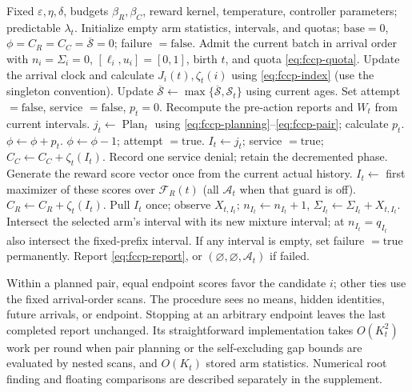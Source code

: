 \documentclass[11pt]{article}
\theoremstyle{remark}
\begin{document}
\begin{algorithm}[tbp]
\caption{Flexible certificate-cost planning (F-CCP)}\label{alg:flexible-ccp}
\footnotesize
\begin{algorithmic}[1]
\Require Fixed $\varepsilon,\eta,\delta$, budgets $\beta_R,\beta_C$,
reward kernel, temperature, controller parameters; predictable $\lambda_t$.
\State Initialize empty arm statistics, intervals, and quotas;
$\mathrm{base}=0$, $\phi=C_R=C_C=\overline{\mathcal S}=0$; failure $=\mathrm{false}$.
 \State Admit the current batch in arrival order with $n_i=\Sigma_i=0$,
 $[\ell_i,u_i]=[0,1]$, birth $t$, and quota \eqref{eq:fccp-quota}.
 \State Update the arrival clock and calculate $J_i(t),\zeta_t(i)$
 using \eqref{eq:fccp-index} (use the singleton convention).
 \State Update $\overline{\mathcal S}\gets
 \max\{\overline{\mathcal S},\mathcal S_t\}$ using current ages.
 \State Set attempt $=\mathrm{false}$, service $=\mathrm{false}$, $p_t=0$.
  \State Recompute the pre-action reports and $W_t$ from current intervals.
   \State $j_t\gets\operatorname{Plan}_t$ using
   \eqref{eq:fccp-planning}--\eqref{eq:fccp-pair}; calculate $p_t$.
   \State $\phi\gets\phi+p_t$.
    \State $\phi\gets\phi-1$; attempt $=\mathrm{true}$.
   \EndIf
  \EndIf
 \EndIf
   \State $I_t\gets j_t$; service $=\mathrm{true}$;
   $C_C\gets C_C+\zeta_t(I_t)$.
  \Else
   \State Record one service denial; retain the decremented phase.
  \EndIf
 \EndIf
  \State Generate the reward score vector once from the current actual history.
  \State $I_t\gets$ first maximizer of these scores over $\mathcal F_R(t)$
  (all $\mathcal A_t$ when that guard is off).
  \State $C_R\gets C_R+\zeta_t(I_t)$.
 \EndIf
 \State Pull $I_t$ once; observe $X_{t,I_t}$;
 $n_{I_t}\gets n_{I_t}+1$, $\Sigma_{I_t}\gets\Sigma_{I_t}+X_{t,I_t}$.
  \State Intersect the selected arm's interval with its new mixture interval;
  at $n_{I_t}=q_{I_t}$ also intersect the fixed-prefix interval.
  \State If any interval is empty, set failure $=\mathrm{true}$ permanently.
 \EndIf
 \State Report \eqref{eq:fccp-report}, or
 $(\varnothing,\varnothing,\mathcal A_t)$ if failed.
\EndFor
\end{algorithmic}
\end{algorithm}

Within a planned pair, equal endpoint scores favor the candidate $i$;
other ties use the fixed arrival-order scans. The procedure sees no
means, hidden identities, future arrivals, or endpoint. Stopping at an
arbitrary endpoint leaves the last completed report unchanged. Its
straightforward implementation takes $O(K_t^2)$ work per round when pair
planning or the self-excluding gap bounds are evaluated by nested scans,
and $O(K_t)$ stored arm statistics. Numerical root finding and floating
comparisons are described separately in the supplement.
\end{document}
